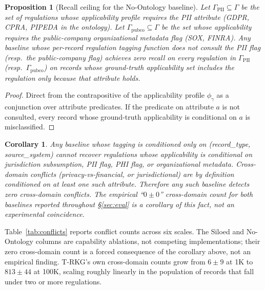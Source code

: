 \documentclass{ieeeaccess}
\newtheorem{proposition}{Proposition}
\newtheorem{corollary}{Corollary}
\begin{document}
\begin{proposition}[Recall ceiling for the No-Ontology baseline]
Let $\Gamma_{\mathrm{PII}} \subseteq \Gamma$ be the set of regulations whose applicability profile requires the PII attribute (GDPR, CPRA, PIPEDA in the ontology). Let $\Gamma_{\mathrm{pubco}} \subseteq \Gamma$ be the set whose applicability requires the public-company organizational metadata flag (SOX, FINRA). Any baseline whose per-record regulation tagging function does not consult the PII flag (resp.\ the public-company flag) achieves zero recall on every regulation in $\Gamma_{\mathrm{PII}}$ (resp.\ $\Gamma_{\mathrm{pubco}}$) on records whose ground-truth applicability set includes the regulation only because that attribute holds.
\end{proposition}

\begin{proof}
Direct from the contrapositive of the applicability profile $\phi_\gamma$ as a conjunction over attribute predicates. If the predicate on attribute $a$ is not consulted, every record whose ground-truth applicability is conditional on $a$ is misclassified.
\end{proof}

\begin{corollary}
Any baseline whose tagging is conditioned only on (record\_type, source\_system) cannot recover regulations whose applicability is conditional on jurisdiction subsumption, PII flag, PHI flag, or organizational metadata. Cross-domain conflicts (privacy-vs-financial, or jurisdictional) are by definition conditioned on at least one such attribute. Therefore any such baseline detects zero cross-domain conflicts. The empirical ``$0 \pm 0$'' cross-domain count for both baselines reported throughout §\ref{sec:eval} is a corollary of this fact, not an experimental coincidence.
\end{corollary}

Table~\ref{tab:conflicts} reports conflict counts across six scales. The Siloed and No-Ontology columns are capability ablations, not competing implementations; their zero cross-domain count is a forced consequence of the corollary above, not an empirical finding. T-RKG's own cross-domain counts grow from $6 \pm 9$ at 1K to $813 \pm 44$ at 100K, scaling roughly linearly in the population of records that fall under two or more regulations.
\end{document}
